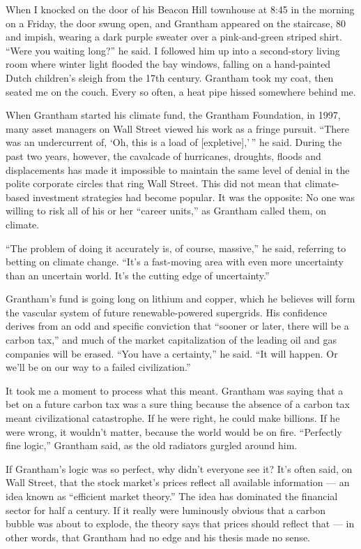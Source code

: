 When I knocked on the door of his Beacon Hill townhouse at 8:45 in the
morning on a Friday, the door swung open, and Grantham appeared on the
staircase, 80 and impish, wearing a dark purple sweater over a
pink-and-green striped shirt. ``Were you waiting long?'' he said. I
followed him up into a second-story living room where winter light
flooded the bay windows, falling on a hand-painted Dutch children's
sleigh from the 17th century. Grantham took my coat, then seated me on
the couch. Every so often, a heat pipe hissed somewhere behind me.

When Grantham started his climate fund, the Grantham Foundation, in
1997, many asset managers on Wall Street viewed his work as a fringe
pursuit. ``There was an undercurrent of, `Oh, this is a load of
{[}expletive{]},' '' he said. During the past two years, however, the
cavalcade of hurricanes, droughts, floods and displacements has made it
impossible to maintain the same level of denial in the polite corporate
circles that ring Wall Street. This did not mean that climate-based
investment strategies had become popular. It was the opposite: No one
was willing to risk all of his or her ``career units,'' as Grantham
called them, on climate.

``The problem of doing it accurately is, of course, massive,'' he said,
referring to betting on climate change. ``It's a fast-moving area with
even more uncertainty than an uncertain world. It's the cutting edge of
uncertainty.''

Grantham's fund is going long on lithium and copper, which he believes
will form the vascular system of future renewable-powered supergrids.
His confidence derives from an odd and specific conviction that ``sooner
or later, there will be a carbon tax,'' and much of the market
capitalization of the leading oil and gas companies will be erased.
``You have a certainty,'' he said. ``It will happen. Or we'll be on our
way to a failed civilization.''

It took me a moment to process what this meant. Grantham was saying that
a bet on a future carbon tax was a sure thing because the absence of a
carbon tax meant civilizational catastrophe. If he were right, he could
make billions. If he were wrong, it wouldn't matter, because the world
would be on fire. ``Perfectly fine logic,'' Grantham said, as the old
radiators gurgled around him.

If Grantham's logic was so perfect, why didn't everyone see it? It's
often said, on Wall Street, that the stock market's prices reflect all
available information --- an idea known as ``efficient market theory.''
The idea has dominated the financial sector for half a century. If it
really were luminously obvious that a carbon bubble was about to
explode, the theory says that prices should reflect that --- in other
words, that Grantham had no edge and his thesis made no sense.

